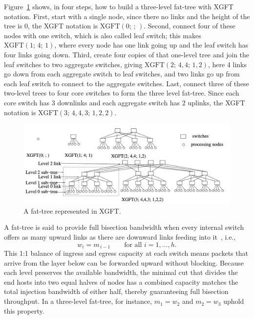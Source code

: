 Figure~\ref{fig:fat-treexgft} shows, in four steps, how to build a three-level fat-tree with XGFT notation.  
First, start with a single node, since there no links and the height of the tree is 0, the XGFT notation is $\mathrm{XGFT}(0;\,;\,)$.  
Second, connect four of these nodes with one switch, which is also called leaf switch; this makes
$\mathrm{XGFT}(1;\,4;\,1)$, where every node has one link going up and the leaf switch has four links going down.  
Third, create four copies of that one-level tree and join the leaf switches to two aggregate switches, giving
$\mathrm{XGFT}(2;\,4,4;\,1,2)$, here 4 links go down from each aggregate switch to leaf switches, and two links go up from 
each leaf switch to connect to the aggregate switches.  
Last, connect three of these two-level trees to four core switches to form the three level fat-tree. Since each core switch has 3 downlinks and each aggregate switch has 2 uplinks, the XGFT notation is $\mathrm{XGFT}(3;\,4,4,3;\,1,2,2)$. 
\begin{figure}[h!]
  \centering
  \includegraphics[width=0.8\columnwidth]{./figs/xgft.png}
  \caption{A fat-tree represented in XGFT.}
  \label{fig:fat-treexgft}
\end{figure}

A fat-tree is said to provide full bisection bandwidth when every internal switch offers as many upward links as there are downward links feeding into it~\cite{priceinfiniband}, i.e.,
\[
  w_{i}=m_{\,i-1}\qquad\text{for all }i=1,\dots ,h .
\]
This 1:1 balance of ingress and egress capacity at each switch means packets that arrive from the layer below can be forwarded upward without blocking.  Because each level preserves the available bandwidth, the minimal cut that divides the end hosts into two equal halves of nodes has a combined capacity matches the total injection bandwidth of either half, thereby guaranteeing full bisection throughput.  In a three-level fat-tree, for instance, \(m_{1}=w_{2}\) and \(m_{2}=w_{3}\) uphold this property.

